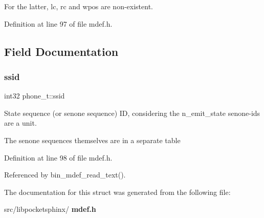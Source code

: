 For the latter, lc, rc and wpos are non-\/existent. 

Definition at line 97 of file mdef.\+h.



\subsection{Field Documentation}
\mbox{\label{structphone__t_af2f31836358c1c29c38a361b3923b859}} 
\subsubsection{ssid}
{\footnotesize\ttfamily int32 phone\+\_\+t\+::ssid}



State sequence (or senone sequence) ID, considering the n\+\_\+emit\+\_\+state senone-\/ids are a unit. 

The senone sequences themselves are in a separate table 

Definition at line 98 of file mdef.\+h.



Referenced by bin\+\_\+mdef\+\_\+read\+\_\+text().



The documentation for this struct was generated from the following file\+:\begin{DoxyCompactItemize}
\item 
src/libpocketsphinx/\textbf{ mdef.\+h}\end{DoxyCompactItemize}
